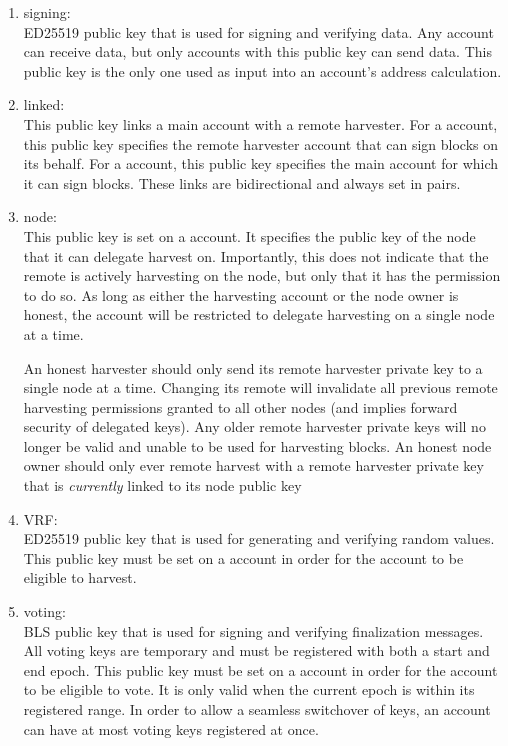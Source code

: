 \begin{enumerate}
	\item{signing: \\
		ED25519 public key that is used for signing and verifying data.
		Any account can receive data, but only accounts with this public key can send data.
		This public key is the only one used as input into an account's address calculation.
	}
	\item{linked: \\
		This public key links a main account with a remote harvester.
		For a  account, this public key specifies the remote harvester account that can sign blocks on its behalf.
		For a  account, this public key specifies the main account for which it can sign blocks.
		These links are bidirectional and always set in pairs.
	}
	\item{node: \\
		This public key is set on a  account.
		It specifies the public key of the node that it can delegate harvest on.
		Importantly, this does not indicate that the remote is actively harvesting on the node, but only that it has the permission to do so.
		As long as either the harvesting account or the node owner is honest, the account will be restricted to delegate harvesting on a single node at a time.

		An honest harvester should only send its remote harvester private key to a single node at a time.
		Changing its remote will invalidate all previous remote harvesting permissions granted to all other nodes (and implies forward security of delegated keys).
		Any older remote harvester private keys will no longer be valid and unable to be used for harvesting blocks.
		An honest node owner should only ever remote harvest with a remote harvester private key that is \emph{currently} linked to its node public key
	}
	\item{VRF: \\
		ED25519 public key that is used for generating and verifying random values.
		This public key must be set on a  account in order for the account to be eligible to harvest.
	}
	\item{voting: \\
		BLS public key that is used for signing and verifying finalization messages.
		All voting keys are temporary and must be registered with both a start and end epoch.
		This public key must be set on a  account in order for the account to be eligible to vote.
		It is only valid when the current epoch is within its registered range.
		In order to allow a seamless switchover of keys, an account can have at most  voting keys registered at once.
	}
\end{enumerate}
